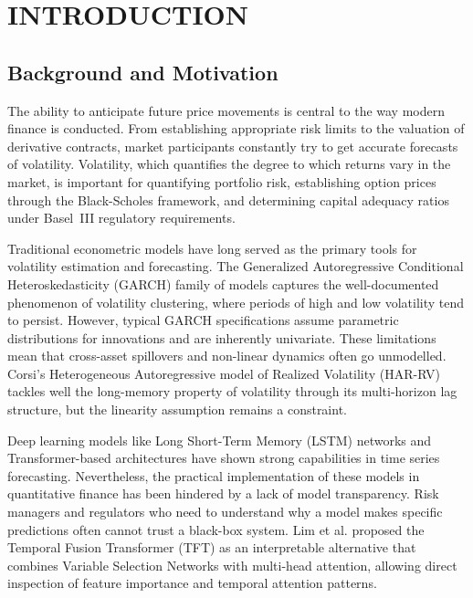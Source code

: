 \chapter{INTRODUCTION}
\label{ChapterIntroduction}

\section{Background and Motivation}

The ability to anticipate future price movements is central to the way modern finance is conducted. From establishing appropriate risk limits to the valuation of derivative contracts, market participants constantly try to get accurate forecasts of volatility. Volatility, which quantifies the degree to which returns vary in the market, is important for quantifying portfolio risk, establishing option prices through the Black-Scholes framework, and determining capital adequacy ratios under Basel~III regulatory requirements.

Traditional econometric models have long served as the primary tools for volatility estimation and forecasting. The Generalized Autoregressive Conditional Heteroskedasticity (GARCH) family of models \cite{bollerslev1986} captures the well-documented phenomenon of volatility clustering, where periods of high and low volatility tend to persist. However, typical GARCH specifications assume parametric distributions for innovations and are inherently univariate. These limitations mean that cross-asset spillovers and non-linear dynamics often go unmodelled. Corsi's Heterogeneous Autoregressive model of Realized Volatility (HAR-RV) \cite{corsi2009} tackles well the long-memory property of volatility through its multi-horizon lag structure, but the linearity assumption remains a constraint.

Deep learning models like Long Short-Term Memory (LSTM) networks and Transformer-based architectures have shown strong capabilities in time series forecasting. Nevertheless, the practical implementation of these models in quantitative finance has been hindered by a lack of model transparency. Risk managers and regulators who need to understand why a model makes specific predictions often cannot trust a black-box system. Lim et al. \cite{lim2021} proposed the Temporal Fusion Transformer (TFT) as an interpretable alternative that combines Variable Selection Networks with multi-head attention, allowing direct inspection of feature importance and temporal attention patterns.

